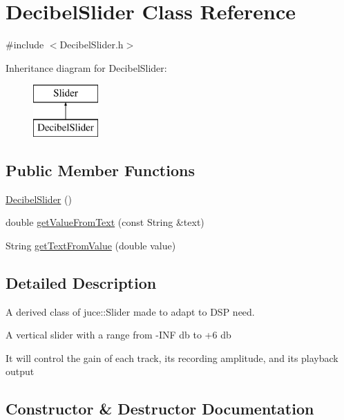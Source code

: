 \hypertarget{class_decibel_slider}{}\section{Decibel\+Slider Class Reference}
\label{class_decibel_slider}


{\ttfamily \#include $<$Decibel\+Slider.\+h$>$}

Inheritance diagram for Decibel\+Slider\+:\begin{figure}[H]
\begin{center}
\leavevmode
\includegraphics[height=2.000000cm]{class_decibel_slider}
\end{center}
\end{figure}
\subsection*{Public Member Functions}
\begin{DoxyCompactItemize}
\item 
\mbox{\hyperlink{class_decibel_slider_ab0b82a875884889d993ffe94cef48903}{Decibel\+Slider}} ()
\item 
double \mbox{\hyperlink{class_decibel_slider_a18445cf6cf6d356e772085b5b4551b9a}{get\+Value\+From\+Text}} (const String \&text)
\item 
String \mbox{\hyperlink{class_decibel_slider_a5fe910f745531b7c9eec653a3a7a6405}{get\+Text\+From\+Value}} (double value)
\end{DoxyCompactItemize}


\subsection{Detailed Description}
A derived class of juce\+::\+Slider made to adapt to D\+SP need.

A vertical slider with a range from -\/I\+NF db to +6 db

It will control the gain of each track, its recording amplitude, and its playback output 

\subsection{Constructor \& Destructor Documentation}
\mbox{\label{class_decibel_slider_ab0b82a875884889d993ffe94cef48903}} 
